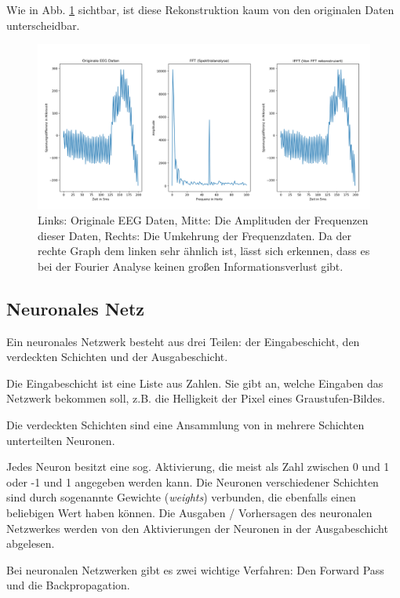 \documentclass[10pt]{article}
\newcommand{\eng}[1]{\textit{#1}}
\begin{document}
Wie in Abb. \ref{fig:ifft} sichtbar, ist diese Rekonstruktion kaum von den originalen Daten unterscheidbar. %

\begin{figure}[h!]
    \centering
    \includegraphics[width=\linewidth]{pictures/blink_fft_ifft.png}
    \caption{Links: Originale EEG Daten, Mitte: Die Amplituden der Frequenzen dieser Daten, Rechts: Die Umkehrung der Frequenzdaten. Da der rechte Graph dem linken sehr ähnlich ist, lässt sich erkennen, dass es bei der Fourier Analyse keinen großen Informationsverlust gibt.}
    \label{fig:ifft}
\end{figure}

\subsection{Neuronales Netz}

Ein neuronales Netzwerk besteht aus drei Teilen: der Eingabeschicht, den verdeckten Schichten und der Ausgabeschicht. 

Die Eingabeschicht ist eine Liste aus Zahlen. 
Sie gibt an, welche Eingaben das Netzwerk bekommen soll, z.B. die Helligkeit der Pixel eines Graustufen-Bildes.

Die verdeckten Schichten sind eine Ansammlung von in mehrere Schichten unterteilten Neuronen.

Jedes Neuron besitzt eine sog. Aktivierung, die meist als Zahl zwischen 0 und 1 oder -1 und 1 angegeben werden kann. 
Die Neuronen verschiedener Schichten sind durch sogenannte Gewichte (\eng{weights}) verbunden, die ebenfalls einen beliebigen Wert haben können.
Die Ausgaben / Vorhersagen des neuronalen Netzwerkes werden von den Aktivierungen der Neuronen in der Ausgabeschicht abgelesen.

Bei neuronalen Netzwerken gibt es zwei wichtige Verfahren: Den Forward Pass und die Backpropagation.
\end{document}
